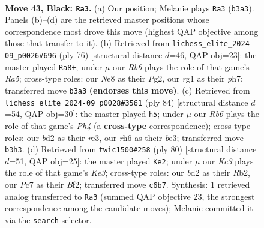\documentclass[11pt]{article}
\begin{document}
\clearpage

\begin{figure}[p]\centering
\begin{subfigure}{0.46\textwidth}\centering
\resizebox{\linewidth}{!}{%
\newchessgame
\chessboard[
  setfen={4n3/p1p5/2k2p1R/8/4rP1p/1r6/2KB3P/5BR1 b - - 1 43},
  showmover=false,
  pgfstyle=straightmove, color=movearrow, markmove={b3-a3}
]}
\caption{}
\end{subfigure}\hfill
\begin{subfigure}{0.46\textwidth}\centering
\resizebox{\linewidth}{!}{%
\newchessgame
\chessboard[
  setfen={6k1/2R3bp/4p1b1/R7/1p2Pr2/5P2/6PP/5K2 w - - 0 39},
  showmover=false,
  pgfstyle=straightmove, color=movearrow, markmove={a5-a8}
]}
\caption{}
\end{subfigure}
\\[4pt]
\begin{subfigure}{0.46\textwidth}\centering
\resizebox{\linewidth}{!}{%
\newchessgame
\chessboard[
  setfen={6k1/R7/4N1pp/2PK4/5P1P/p1r1b3/6P1/8 w - - 0 43},
  showmover=false,
  pgfstyle=straightmove, color=movearrow, markmove={h4-h5}
]}
\caption{}
\end{subfigure}\hfill
\begin{subfigure}{0.46\textwidth}\centering
\resizebox{\linewidth}{!}{%
\newchessgame
\chessboard[
  setfen={2r5/7k/p4p1p/3bbN2/6PP/R1P1K3/1R3B2/3r4 w - - 0 41},
  showmover=false,
  pgfstyle=straightmove, color=movearrow, markmove={e3-e2}
]}
\caption{}
\end{subfigure}
\caption{\textbf{Move 43, Black: \texttt{Ra3}.} (a) Our position; Melanie plays \texttt{Ra3} (\texttt{b3a3}). Panels (b)--(d) are the retrieved master positions whose correspondence most drove this move (highest QAP objective among those that transfer to it). (b) Retrieved from \texttt{lichess\_elite\_2024-09\_p0026\#696} (ply 76) [structural distance $d$=46, QAP obj=23]: the master played \texttt{Ra8+}; under $\mu$ our \emph{Rb6} plays the role of that game's \emph{Ra5}; cross-type roles: our \emph{N}e8 as their \emph{P}g2, our \emph{r}g1 as their \emph{p}h7; transferred move \texttt{b3a3} \textbf{(endorses this move)}. (c) Retrieved from \texttt{lichess\_elite\_2024-09\_p0028\#3561} (ply 84) [structural distance $d$=54, QAP obj=30]: the master played \texttt{h5}; under $\mu$ our \emph{Rb6} plays the role of that game's \emph{Ph4} (a \textbf{cross-type} correspondence); cross-type roles: our \emph{b}d2 as their \emph{r}c3, our \emph{r}h6 as their \emph{b}e3; transferred move \texttt{b3h3}. (d) Retrieved from \texttt{twic1500\#258} (ply 80) [structural distance $d$=51, QAP obj=25]: the master played \texttt{Ke2}; under $\mu$ our \emph{Kc3} plays the role of that game's \emph{Ke3}; cross-type roles: our \emph{b}d2 as their \emph{R}b2, our \emph{P}c7 as their \emph{B}f2; transferred move \texttt{c6b7}. Synthesis: 1 retrieved analog transferred to \texttt{Ra3} (summed QAP objective 23, the strongest correspondence among the candidate moves); Melanie committed it via the \texttt{search} selector.}
\label{fig:thought-m85}
\end{figure}
\end{document}
